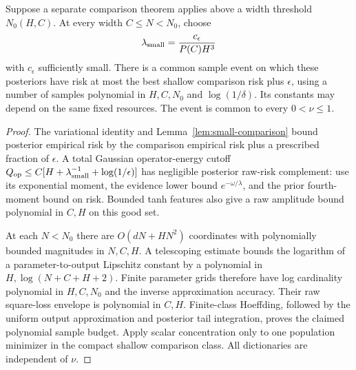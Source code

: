\begin{proposition}
\label{prop:small-width-statistics}
Suppose a separate comparison theorem applies above a width threshold $N_0(H,C)$. At every width $C\le N<N_0$, choose
\[
 \lambda_{\rm small}=\frac{c_\epsilon}{P(C)H^3}
\]
with $c_\epsilon$ sufficiently small. There is a common sample event on which these posteriors have risk at most the best shallow comparison risk plus $\epsilon$, using a number of samples polynomial in $H,C,N_0$ and $\log(1/\delta)$. Its constants may depend on the same fixed resources. The event is common to every $0<\nu\le1$.
\end{proposition}
\begin{proof}
The variational identity and Lemma~\ref{lem:small-comparison} bound posterior empirical risk by the comparison empirical risk plus a prescribed fraction of $\epsilon$. A total Gaussian operator-energy cutoff
$Q_{\rm op}\le C[H+\lambda_{\rm small}^{-1}+\log(1/\epsilon)]$
has negligible posterior raw-risk complement: use its exponential moment, the evidence lower bound $e^{-\omega/\lambda}$, and the prior fourth-moment bound on risk. Bounded tanh features also give a raw amplitude bound polynomial in $C,H$ on this good set.

At each $N<N_0$ there are $O(dN+HN^2)$ coordinates with polynomially bounded magnitudes in $N,C,H$. A telescoping estimate bounds the logarithm of a parameter-to-output Lipschitz constant by a polynomial in $H,\log(N+C+H+2)$. Finite parameter grids therefore have log cardinality polynomial in $H,C,N_0$ and the inverse approximation accuracy. Their raw square-loss envelope is polynomial in $C,H$. Finite-class Hoeffding, followed by the uniform output approximation and posterior tail integration, proves the claimed polynomial sample budget. Apply scalar concentration only to one population minimizer in the compact shallow comparison class. All dictionaries are independent of $\nu$.
\end{proof}
